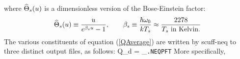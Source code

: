 \documentclass[letterpaper]{article}
\begin{document}
where $\widehat{\Theta}_s(u)$ is a dimensionless version 
of the Bose-Einstein factor:
$$ \widehat{\Theta}_s(u)\equiv \frac{u}{e^{\beta_s u}-1}, 
   \qquad 
   \beta_s \equiv \frac{\hbar \omega_0}{kT_s}
    \approx \frac{ 2278 }{T_s\text{ in Kelvin.}}
$$
The various constituents of equation (\ref{QAverage}) are written
by {\sc scuff-neq} to three distinct output files, as follows:
{
 \qquad \big\langle Q_d\big\rangle
 = 
   _{\texttt{.NEQPFT}}
}
More specifically, 
\end{document}
